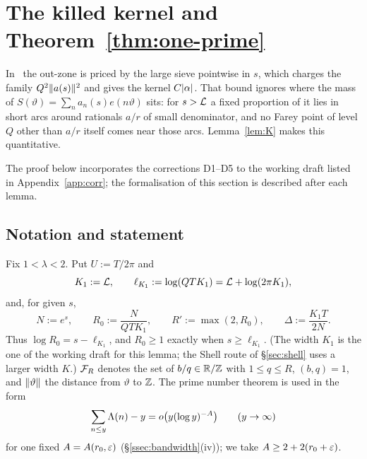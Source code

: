\section{The killed kernel and Theorem~\ref{thm:one-prime}}\label{sec:lemmaK}

In~\cite{DSouza} the out-zone is priced by the large sieve pointwise in $s$, which charges the family $Q^2\lVert a(s)\rVert^2$ and
gives the kernel $C\lvert \alpha\rvert$. That bound ignores where the mass of $S(\vartheta)=\sum_na_n(s)e(n\vartheta)$ sits: for $s>\mathcal L$ a fixed
proportion of it lies in short arcs around rationals $a/r$ of small denominator, and no Farey point of level $Q$ other than $a/r$
itself comes near those arcs. Lemma~\ref{lem:K} makes this quantitative.

The proof below incorporates the corrections D1--D5 to the working draft listed in Appendix~\ref{app:corr}; the formalisation of this section
is described after each lemma.

\subsection{Notation and statement}
Fix $1<\lambda<2$. Put $U:=T/2\pi$ and
\[
K_1:=\mathcal L,\qquad \ell_{K_1}:=\log(QTK_1)=\mathcal L+\log(2\pi K_1),
\]
and, for given $s$,
\[
N:=e^s,\qquad R_0:=\frac N{QTK_1},\qquad R':=\max(2,R_0),\qquad \Delta:=\frac{K_1T}{2N}.
\]
Thus $\log R_0=s-\ell_{K_1}$, and $R_0\ge1$ exactly when $s\ge\ell_{K_1}$. (The width $K_1$ is the one of the working draft for this lemma; the Shell route of \S\ref{sec:shell} uses a larger width $K$.) $\mathcal F_R$ denotes the set of $b/q\in\mathbb R/\mathbb Z$ with $1\le q\le R$,
$(b,q)=1$, and $\lVert \vartheta\rVert$ the distance from $\vartheta$ to $\mathbb Z$. The prime number theorem is used in the form
\begin{equation}\label{eq:PNT}
\sum_{n\le y}\Lambda(n)-y=o\bigl(y(\log y)^{-A}\bigr)\qquad(y\to\infty)
\end{equation}
for one fixed $A=A(r_0,\varepsilon)$ (\S\ref{ssec:bandwidth}(iv)); we take $A\ge2+2(r_0+\varepsilon)$.

